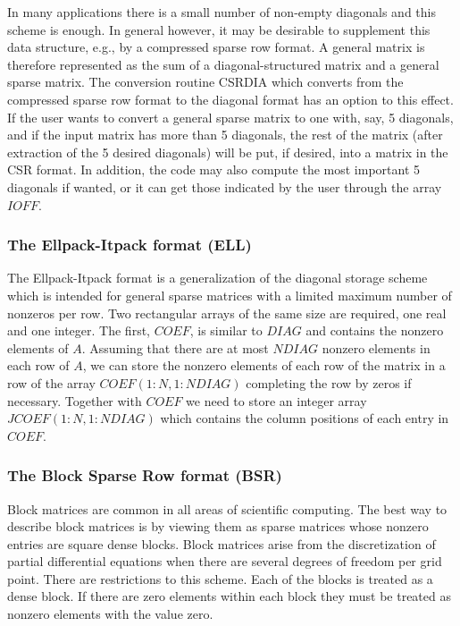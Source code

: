 \documentclass[12pt]{article}
\begin{document}
In many applications there is a small number of non-empty diagonals
and this scheme is enough. In general however, it may be desirable to
supplement this data structure, e.g., by a compressed sparse row
format.  A general matrix is therefore represented as the sum of a
diagonal-structured matrix and a general sparse matrix.  The
conversion routine CSRDIA which converts from the compressed
sparse row format to the diagonal format has an option	 to this
effect.  If the user wants to convert a general sparse matrix to one
with, say, 5 diagonals, and if the input matrix has more than 5
diagonals, the rest of the matrix (after extraction of the 5 desired
diagonals) will be put, if desired, into a matrix in the CSR format.
In addition, the code may also compute the most important 5 diagonals
if wanted, or it can get those indicated by the user through the array
$IOFF$.

\subsubsection{The Ellpack-Itpack format (ELL) }
The Ellpack-Itpack format
\cite{Oppe-Kincaid,Young-Oppe-al,Oppe-NSPCG} is a 
generalization of the diagonal storage scheme which is intended for
general sparse matrices with a limited maximum number of nonzeros per
row. Two rectangular arrays of the same size are required, one real
and one integer.  The first, $COEF$, is similar to $DIAG$ and contains
the nonzero elements of $A$. Assuming that there are at most $NDIAG$
nonzero elements in each row of $A$, we can store the nonzero elements
of each row of the matrix in a row of the array $COEF(1:N,1:NDIAG)$
completing the row by zeros if necessary.  Together with $COEF$ we
need to store an integer array $JCOEF(1:N,1:NDIAG)$ which contains the
column positions of each entry in $COEF$.

\subsubsection{The Block Sparse Row format (BSR)} 
Block matrices are common in all areas of scientific computing. The
best way to describe block matrices is by viewing them as sparse
matrices whose nonzero entries are square dense blocks. Block matrices
arise from the discretization of partial differential equations when
there are several degrees of freedom per grid point.  There are
restrictions to this scheme. Each of the blocks is treated as a dense
block. If there are zero elements within each block they must be
treated as nonzero elements with the value zero.
\end{document}
